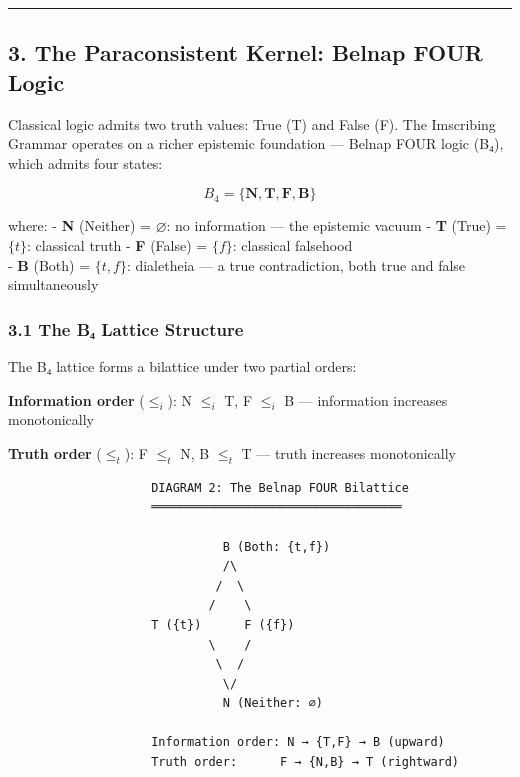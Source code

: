 \begin{center}\rule{0.5\linewidth}{0.5pt}\end{center}

\hypertarget{the-paraconsistent-kernel-belnap-four-logic}{%
\subsection{3. The Paraconsistent Kernel: Belnap FOUR
Logic}\label{the-paraconsistent-kernel-belnap-four-logic}}

Classical logic admits two truth values: True (T) and False (F). The
Imscribing Grammar operates on a richer epistemic foundation --- Belnap
FOUR logic (B₄), which admits four states:

\[B_4 = \{\mathbf{N}, \mathbf{T}, \mathbf{F}, \mathbf{B}\}\]

where: - \textbf{N} (Neither) = \(\varnothing\): no information --- the
epistemic vacuum - \textbf{T} (True) = \(\{t\}\): classical truth -
\textbf{F} (False) = \(\{f\}\): classical falsehood\\
- \textbf{B} (Both) = \(\{t, f\}\): dialetheia --- a true contradiction,
both true and false simultaneously

\hypertarget{the-bux2084-lattice-structure}{%
\subsubsection{3.1 The B₄ Lattice
Structure}\label{the-bux2084-lattice-structure}}

The B₄ lattice forms a bilattice under two partial orders:

\textbf{Information order} (\(\leq_i\)): N \(\leq_i\) T, F \(\leq_i\) B
--- information increases monotonically

\textbf{Truth order} (\(\leq_t\)): F \(\leq_t\) N, B \(\leq_t\) T ---
truth increases monotonically

\begin{verbatim}
                    DIAGRAM 2: The Belnap FOUR Bilattice
                    ═══════════════════════════════════

                              B (Both: {t,f})
                              /\
                             /  \
                            /    \
                    T ({t})      F ({f})
                            \    /
                             \  /
                              \/
                              N (Neither: ∅)

                    Information order: N → {T,F} → B (upward)
                    Truth order:      F → {N,B} → T (rightward)
\end{verbatim}

